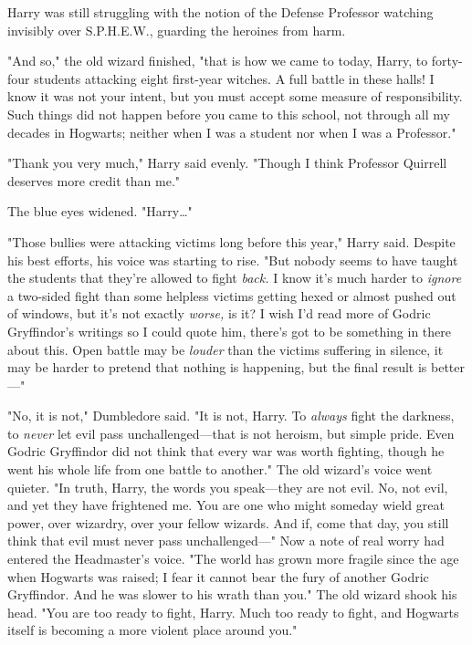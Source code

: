 Harry was still struggling with the notion of the Defense Professor watching 
invisibly over S.P.H.E.W., guarding the heroines from harm.

"And so," the old wizard finished, "that is how we came to today, Harry, to 
forty-four students attacking eight first-year witches. A full battle in these 
halls! I know it was not your intent, but you must accept some measure of 
responsibility. Such things did not happen before you came to this school, not 
through all my decades in Hogwarts; neither when I was a student nor when I was 
a Professor."

"Thank you very much," Harry said evenly. "Though I think Professor Quirrell 
deserves more credit than me."

The blue eyes widened. "Harry{\ldots}"

"Those bullies were attacking victims long before this year," Harry said. 
Despite his best efforts, his voice was starting to rise. "But nobody seems to 
have taught the students that they're allowed to fight \emph{back.} I know it's 
much harder to \emph{ignore} a two-sided fight than some helpless victims 
getting hexed or almost pushed out of windows, but it's not exactly 
\emph{worse,} is it? I wish I'd read more of Godric Gryffindor's writings so I 
could quote him, there's got to be something in there about this. Open battle 
may be \emph{louder} than the victims suffering in silence, it may be harder to 
pretend that nothing is happening, but the final result is better---"

"No, it is not," Dumbledore said. "It is not, Harry. To \emph{always} fight the 
darkness, to \emph{never} let evil pass unchallenged---that is not heroism, but 
simple pride. Even Godric Gryffindor did not think that every war was worth 
fighting, though he went his whole life from one battle to another." The old 
wizard's voice went quieter. "In truth, Harry, the words you speak---they are 
not evil. No, not evil, and yet they have frightened me. You are one who might 
someday wield great power, over wizardry, over your fellow wizards. And if, 
come that day, you still think that evil must never pass unchallenged---" Now a 
note of real worry had entered the Headmaster's voice. "The world has grown 
more fragile since the age when Hogwarts was raised; I fear it cannot bear the 
fury of another Godric Gryffindor. And he was slower to his wrath than you." 
The old wizard shook his head. "You are too ready to fight, Harry. Much too 
ready to fight, and Hogwarts itself is becoming a more violent place around 
you."

